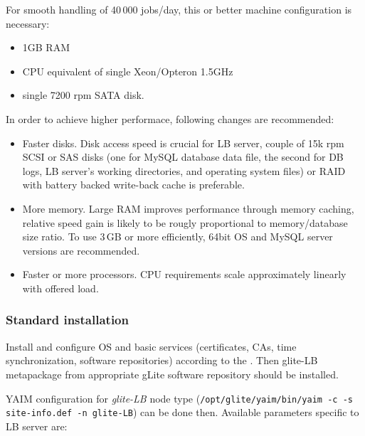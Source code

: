 For smooth handling of 40\,000 jobs/day, this or better machine configuration 
is necessary:
\begin{itemize}
\item 1GB RAM
\item CPU equivalent of single Xeon/Opteron 1.5GHz
\item single 7200 rpm SATA disk.
\end{itemize}
In order to achieve higher performace, following changes are recommended:
\begin{itemize}
\item Faster disks. Disk access speed is crucial for LB server, couple of 15k rpm
SCSI or SAS disks (one for MySQL database data file, the second for DB logs, LB server's
working directories, and operating system files) or RAID with battery backed 
write-back cache is preferable.
\item More memory. Large RAM improves performance through memory caching,
relative speed gain is likely to be rougly proportional to memory/database size ratio.
To use 3\,GB or more efficiently, 64bit OS and MySQL server versions are recommended.
\item Faster or more processors. CPU requirements scale approximately linearly with
offered load.
\end{itemize}

\subsubsection{Standard installation}

Install and configure OS and basic services (certificates, CAs, time synchronization, software repositories) according to the . Then glite-LB metapackage from appropriate gLite software repository should be installed.

YAIM configuration for \emph{glite-LB} node type 
(\texttt{/opt/glite/yaim/bin/yaim -c -s site-info.def -n glite-LB}) 
can be done then. Available parameters specific to LB server are:


